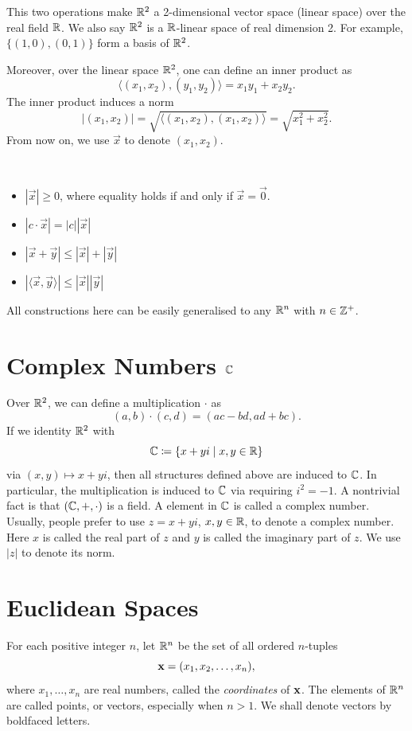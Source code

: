 This two operations make $\mathbb R^2$ a 2-dimensional vector space (linear space) over the real field $\mathbb R$. We also say $\mathbb R^2$ is a $\mathbb R$-linear space of real dimension 2. For example, $\{(1,0),(0,1)\}$ form a basis of $\mathbb R^2$.

Moreover, over the linear space $\mathbb R^2$, one can define an inner product as
\[ \langle(x_1,x_2),(y_1,y_2)\rangle=x_1y_1+x_2y_2. \]
The inner product induces a norm
\[ |(x_1,x_2)|=\sqrt{\langle(x_1,x_2),(x_1,x_2)\rangle}=\sqrt{x_1^2+x_2^2}. \]
From now on, we use $\vec{x}$ to denote $(x_1,x_2)$.
\begin{proposition} \
\begin{itemize}
\item $|\vec{x}|\ge0$, where equality holds if and only if $\vec{x}=\vec{0}$.
\item $|c\cdot\vec{x}|=|c||\vec{x}|$
\item $|\vec{x}+\vec{y}|\le|\vec{x}|+|\vec{y}|$
\item $|\langle\vec{x},\vec{y}\rangle|\le|\vec{x}||\vec{y}|$
\end{itemize}
\end{proposition}

All constructions here can be easily generalised to any $\mathbb R^n$ with $n\in\mathbb Z^+$.

\section{Complex Numbers $\mathbb C$}


Over $\mathbb R^2$, we can define a multiplication $\cdot$ as
\[ (a,b)\cdot(c,d)=(ac-bd,ad+bc). \]
If we identity $\mathbb R^2$ with
\[ \mathbb C\coloneqq\{x+yi\mid x,y\in\mathbb R\} \]
via $(x,y)\mapsto x+yi$, then all structures defined above are induced to $\mathbb C$. In particular, the multiplication is induced to $\mathbb C$ via requiring $i^2=-1$. A nontrivial fact is that $(\mathbb C,+,\cdot)$ is a field. A element in $\mathbb C$ is called a complex number. Usually, people prefer to use $z=x+yi$, $x,y\in\mathbb R$, to denote a complex number. Here $x$ is called the real part of $z$ and $y$ is called the imaginary part of $z$. We use $|z|$ to denote its norm.
\pagebreak

\section{Euclidean Spaces}
For each positive integer $n$, let $\mathbb R^n$ be the set of all ordered $n$-tuples
\[ \vb{x}=(x_1,x_2,\dots,x_n), \]
where $x_1,\dots,x_n$ are real numbers, called the \emph{coordinates} of $\vb{x}$. The elements of $\mathbb R^n$ are called points, or vectors, especially when $n>1$. We shall denote vectors by boldfaced letters.


